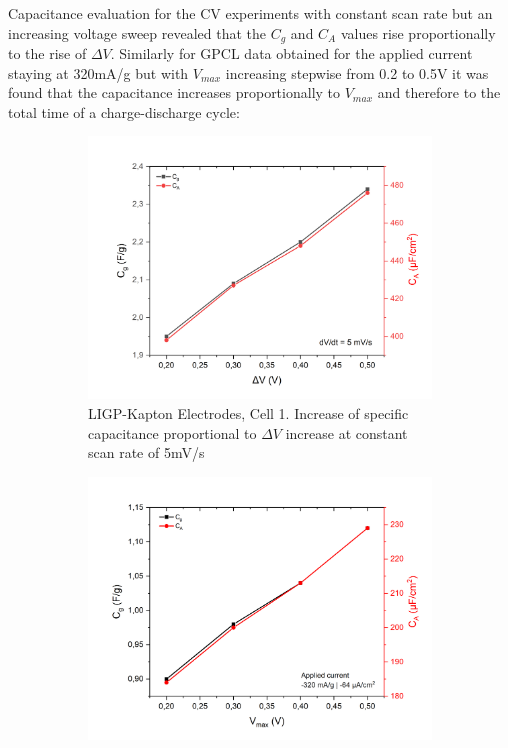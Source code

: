 Capacitance evaluation for the CV experiments with constant scan rate but an increasing voltage sweep revealed that the $C_g$ and $C_A$ values rise proportionally to the rise of $\Delta V$. Similarly for GPCL data obtained for the applied current staying at 320\:mA/g but with $V_{max}$ increasing stepwise from 0.2 to 0.5\:V it was found that the capacitance increases proportionally to $V_{max}$ and therefore to the total time of a charge-discharge cycle: 

\begin{figure}[H]
\begin{subfigure}{0.49\textwidth}
\includegraphics[width=1\textwidth]{Figures/Results/Electrochemistry/Comparisons/Capacitance_const_scan_rate_5.jpg} 
\captionsetup{width=0.9\linewidth}
\caption{LIGP-Kapton Electrodes, Cell 1. Increase of specific capacitance proportional to $\Delta V$ increase at constant scan rate of 5\:mV/s}
\label{fig:LIG-PI-cell1-C-CV-increase}
\end{subfigure}
\begin{subfigure}{0.49\textwidth}
\includegraphics[width=1\textwidth]{Figures/Results/Electrochemistry/Comparisons/Capacitance_const_current_320.jpg}

\end{subfigure}
\end{figure}
